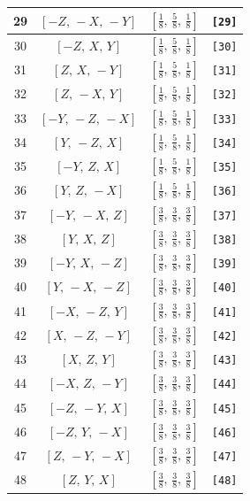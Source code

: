 \documentclass[fleqn,8pt]{jsarticle}
\begin{document}
\begin{longtable}{cccc}
29 & $\left[ - Z,\, - X,\, - Y \right]$ & $\left[ \frac{1}{8},\, \frac{5}{8},\, \frac{1}{8} \right]$ & {\tt [29]} \\ \hline
30 & $\left[ - Z,\, X,\, Y \right]$ & $\left[ \frac{1}{8},\, \frac{5}{8},\, \frac{1}{8} \right]$ & {\tt [30]} \\ \hline
31 & $\left[ Z,\, X,\, - Y \right]$ & $\left[ \frac{1}{8},\, \frac{5}{8},\, \frac{1}{8} \right]$ & {\tt [31]} \\ \hline
32 & $\left[ Z,\, - X,\, Y \right]$ & $\left[ \frac{1}{8},\, \frac{5}{8},\, \frac{1}{8} \right]$ & {\tt [32]} \\ \hline
33 & $\left[ - Y,\, - Z,\, - X \right]$ & $\left[ \frac{1}{8},\, \frac{5}{8},\, \frac{1}{8} \right]$ & {\tt [33]} \\ \hline
34 & $\left[ Y,\, - Z,\, X \right]$ & $\left[ \frac{1}{8},\, \frac{5}{8},\, \frac{1}{8} \right]$ & {\tt [34]} \\ \hline
35 & $\left[ - Y,\, Z,\, X \right]$ & $\left[ \frac{1}{8},\, \frac{5}{8},\, \frac{1}{8} \right]$ & {\tt [35]} \\ \hline
36 & $\left[ Y,\, Z,\, - X \right]$ & $\left[ \frac{1}{8},\, \frac{5}{8},\, \frac{1}{8} \right]$ & {\tt [36]} \\ \hline
37 & $\left[ - Y,\, - X,\, Z \right]$ & $\left[ \frac{3}{8},\, \frac{3}{8},\, \frac{3}{8} \right]$ & {\tt [37]} \\ \hline
38 & $\left[ Y,\, X,\, Z \right]$ & $\left[ \frac{3}{8},\, \frac{3}{8},\, \frac{3}{8} \right]$ & {\tt [38]} \\ \hline
39 & $\left[ - Y,\, X,\, - Z \right]$ & $\left[ \frac{3}{8},\, \frac{3}{8},\, \frac{3}{8} \right]$ & {\tt [39]} \\ \hline
40 & $\left[ Y,\, - X,\, - Z \right]$ & $\left[ \frac{3}{8},\, \frac{3}{8},\, \frac{3}{8} \right]$ & {\tt [40]} \\ \hline
41 & $\left[ - X,\, - Z,\, Y \right]$ & $\left[ \frac{3}{8},\, \frac{3}{8},\, \frac{3}{8} \right]$ & {\tt [41]} \\ \hline
42 & $\left[ X,\, - Z,\, - Y \right]$ & $\left[ \frac{3}{8},\, \frac{3}{8},\, \frac{3}{8} \right]$ & {\tt [42]} \\ \hline
43 & $\left[ X,\, Z,\, Y \right]$ & $\left[ \frac{3}{8},\, \frac{3}{8},\, \frac{3}{8} \right]$ & {\tt [43]} \\ \hline
44 & $\left[ - X,\, Z,\, - Y \right]$ & $\left[ \frac{3}{8},\, \frac{3}{8},\, \frac{3}{8} \right]$ & {\tt [44]} \\ \hline
45 & $\left[ - Z,\, - Y,\, X \right]$ & $\left[ \frac{3}{8},\, \frac{3}{8},\, \frac{3}{8} \right]$ & {\tt [45]} \\ \hline
46 & $\left[ - Z,\, Y,\, - X \right]$ & $\left[ \frac{3}{8},\, \frac{3}{8},\, \frac{3}{8} \right]$ & {\tt [46]} \\ \hline
47 & $\left[ Z,\, - Y,\, - X \right]$ & $\left[ \frac{3}{8},\, \frac{3}{8},\, \frac{3}{8} \right]$ & {\tt [47]} \\ \hline
48 & $\left[ Z,\, Y,\, X \right]$ & $\left[ \frac{3}{8},\, \frac{3}{8},\, \frac{3}{8} \right]$ & {\tt [48]} \\
\end{longtable}
\end{document}
